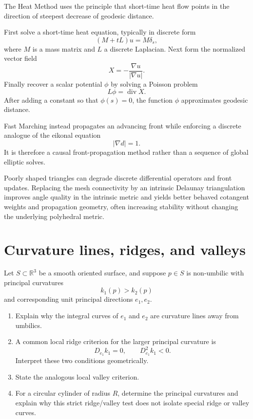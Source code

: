 \begin{solution}
The Heat Method uses the principle that short-time heat flow points in the
direction of steepest decrease of geodesic distance.

First solve a short-time heat equation, typically in discrete form
\[
(M+tL)u=M\delta_s,
\]
where \(M\) is a mass matrix and \(L\) a discrete Laplacian.
Next form the normalized vector field
\[
X=-\frac{\nabla u}{|\nabla u|}.
\]
Finally recover a scalar potential \(\phi\) by solving a Poisson problem
\[
L\phi=\operatorname{div}X.
\]
After adding a constant so that \(\phi(s)=0\), the function \(\phi\)
approximates geodesic distance.

Fast Marching instead propagates an advancing front while enforcing a
discrete analogue of the eikonal equation
\[
|\nabla d|=1.
\]
It is therefore a causal front-propagation method rather than a sequence of
global elliptic solves.

Poorly shaped triangles can degrade discrete differential operators and front
updates.  Replacing the mesh connectivity by an intrinsic Delaunay
triangulation improves angle quality in the intrinsic metric and yields better
behaved cotangent weights and propagation geometry, often increasing stability
without changing the underlying polyhedral metric.
\end{solution}


\section{Curvature lines, ridges, and valleys}

\begin{problem}
\label{prob:vii-gap-42}
Let \(S\subset\mathbb{R}^3\) be a smooth oriented surface, and suppose
\(p\in S\) is non-umbilic with principal curvatures
\[
k_1(p)>k_2(p)
\]
and corresponding unit principal directions \(e_1,e_2\).

\begin{enumerate}
\item Explain why the integral curves of \(e_1\) and \(e_2\) are curvature
lines away from umbilics.
\item A common local ridge criterion for the larger principal curvature is
\[
D_{e_1}k_1=0,
\qquad
D_{e_1}^2k_1<0.
\]
Interpret these two conditions geometrically.
\item State the analogous local valley criterion.
\item For a circular cylinder of radius \(R\), determine the principal
curvatures and explain why this strict ridge/valley test does not isolate
special ridge or valley curves.
\end{enumerate}
\end{problem}


